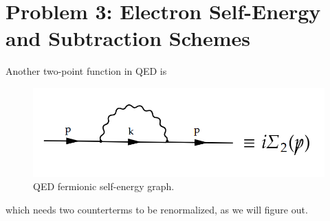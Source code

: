 \documentclass[11pt]{article}
\begin{document}
	\section*{Problem 3: Electron Self-Energy and Subtraction Schemes}
	Another two-point function in QED is
	\begin{figure}[H]
		\centering
		\includegraphics[width=0.5\linewidth]{img/4.png}
		\caption{QED fermionic self-energy graph.}
		\label{qedself}
	\end{figure}
	which needs two counterterms to be renormalized, as we will figure out.
	
\end{document}

